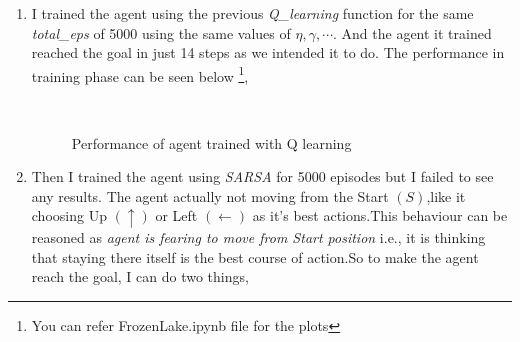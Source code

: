\documentclass[journal,12pt,onecolumn]{IEEEtran}
\providecommand{\brak}[1]{\ensuremath{\left(#1\right)}}
\theoremstyle{remark}
\numberwithin{equation}{section}
\begin{document}
       \begin{enumerate}
	       \item I trained the agent using the previous \textit{Q\_learning} function for the same \textit{total\_eps} of 5000 using the same values of $\eta,\gamma,\cdots$. And the agent it trained reached the goal in just 14 steps as we intended it to do. The performance in training phase can be seen below \footnote{You can refer FrozenLake.ipynb file for the plots},
	      
              \begin{figure}[ht]%
                \centering
		\\
                \caption{Performance of agent trained with Q learning}%
                \label{Q learning}%
             \end{figure}

		
	\item Then I trained the agent using \textit{SARSA} for 5000 episodes but I failed to see any results. The agent actually not moving from the Start $(S)$,like it choosing Up $\brak{\uparrow}$ or Left $\brak{\leftarrow}$ as it's best actions.This behaviour can be reasoned as \emph{agent is fearing to move from Start position} i.e., it is thinking that staying there itself is the best course of action.So to make the agent reach the goal, I can do two things,
		          

\end{enumerate}
\end{document}
